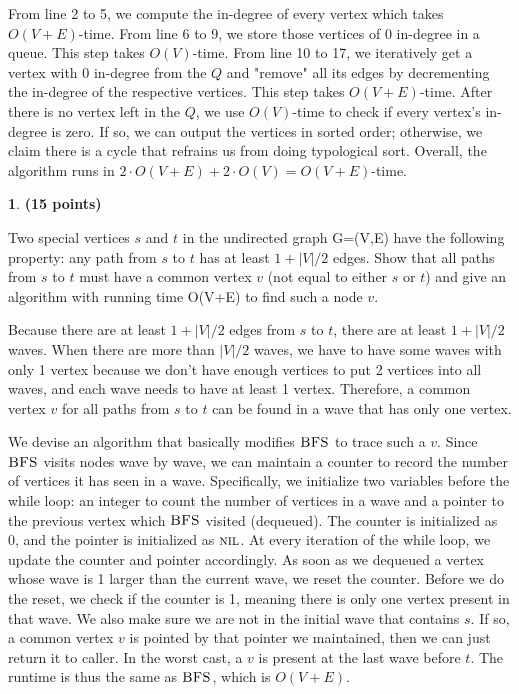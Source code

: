 \documentclass[11pt]{article}
\theoremstyle{definition}
\theoremstyle{theorem}
\newtheorem{prob}{}
\newcommand{\solution}{\medskip\noindent{\color{DarkBlue}\textbf{Solution:}}}
\begin{document}
From line 2 to 5, we compute the in-degree of every vertex which takes $O(V + E)$-time. From line 6 to 9, we store those vertices of 0 in-degree in a queue. This step takes $O(V)$-time. From line 10 to 17, we iteratively get a vertex with 0 in-degree from the $Q$ and "remove" all its edges by decrementing the in-degree of the respective vertices. This step takes $O(V + E)$-time. After there is no vertex left in the $Q$, we use $O(V)$-time to check if every vertex's in-degree is zero. If so, we can output the vertices in sorted order; otherwise, we claim there is a cycle that refrains us from doing typological sort. Overall, the algorithm runs in $2 \cdot O(V+E) + 2 \cdot O(V)  = O(V + E)$-time.


\newpage
\begin{prob} \textbf{(15 points)} 
\end{prob}

Two special vertices $s$ and $t$ in the undirected graph G=(V,E) have the following  property:  any  path  from  $s$  to  $t$  has  at  least  $1  +|V|/2$  edges.   Show  that all paths from $s$ to $t$ must have a common vertex $v$ (not equal to either $s$ or $t$) and give an algorithm with running time O(V+E) to find such a node $v$.


\solution

Because there are at least $1 + |V| / 2$ edges from $s$ to $t$, there are at least $1 + |V| / 2$ waves. When there are more than $|V| / 2$ waves, we have to have some waves with only 1 vertex because we don't have enough vertices to put 2 vertices into all waves, and each wave needs to have at least 1 vertex. Therefore, a common vertex $v$ for all paths from $s$ to $t$ can be found in a wave that has only one vertex.

We devise an algorithm that basically modifies $\textproc{\textsc{BFS}}$ to trace such a $v$. Since $\textproc{\textsc{BFS}}$ visits nodes wave by wave, we can maintain a counter to record the number of vertices it has seen in a wave. Specifically, we initialize two variables before the while loop: an integer to count the number of vertices in a wave and a pointer to the previous vertex which $\textproc{\textsc{BFS}}$ visited (dequeued). The counter is initialized as 0, and the pointer is initialized as $\textproc{\textsc{nil}}$. At every iteration of the while loop, we update the counter and pointer accordingly. As soon as we dequeued a vertex whose wave is 1 larger than the current wave, we reset the counter. Before we do the reset, we check if the counter is 1, meaning there is only one vertex present in that wave. We also make sure we are not in the initial wave that contains $s$. If so, a common vertex $v$ is pointed by that pointer we maintained, then we can just return it to caller. In the worst cast, a $v$ is present at the last wave before $t$. The runtime is thus the same as $\textproc{\textsc{BFS}}$, which is $O(V + E)$.
\end{document}

